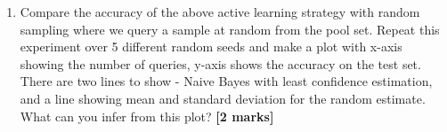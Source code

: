\documentclass[colorlinks,linkcolor=true]{article}
\begin{document}
\begin{enumerate}
\begin{enumerate}
\begin{enumerate}
	\item Compare the accuracy of the above active learning strategy with random sampling where we query a sample at random from the pool set. Repeat this experiment over 5 different random seeds and make a plot with x-axis showing the number of queries, y-axis shows the accuracy on the test set. There are two lines to show - Naive Bayes with least confidence estimation, and a line showing mean and standard deviation for the random estimate. What can you infer from this plot? \textbf{[2 marks]}
	
\end{enumerate}

\end{enumerate}
\end{enumerate}
\end{document}
